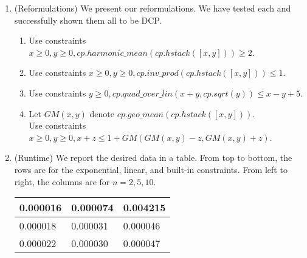 \documentclass{article}
\begin{document}
\begin{enumerate}
    \item (Reformulations) We present our reformulations. We have tested each and successfully shown them all to be DCP. \begin{enumerate}
    	\item Use constraints $x \geq 0, y \geq 0, cp.harmonic\_mean(cp.hstack([x, y])) \geq 2$.
    	\item Use constraints $x \geq 0, y \geq 0, cp.inv\_prod(cp.hstack([x, y])) \leq 1$.
    	\item Use constraints $y \geq 0, cp.quad\_over\_lin(x + y, cp.sqrt(y)) \leq x - y + 5$.
    	\item Let $GM(x, y)$ denote $cp.geo\_mean(cp.hstack([x, y]))$. \\
    	Use constraints $x \geq 0, y \geq 0, x + z \leq 1 + GM(GM(x, y) - z, GM(x, y) + z)$.
   	\end{enumerate}
   
   \item (Runtime) We report the desired data in a table. From top to bottom, the rows are for the exponential, linear, and built-in constraints. From left to right, the columns are for $n = 2, 5, 10$.
   \begin{center}
   	\begin{tabular}{ | m{1.5cm} | m{1.5cm}| m{1.5cm} | } 
   		\hline
   		0.000016 & 0.000074 & 0.004215 \\ 
   		\hline
   		0.000018 & 0.000031 & 0.000046 \\ 
   		\hline
   		0.000022 & 0.000030 & 0.000047 \\ 
   		\hline
   	\end{tabular}
   \end{center}
    
\end{enumerate}
\end{document}
